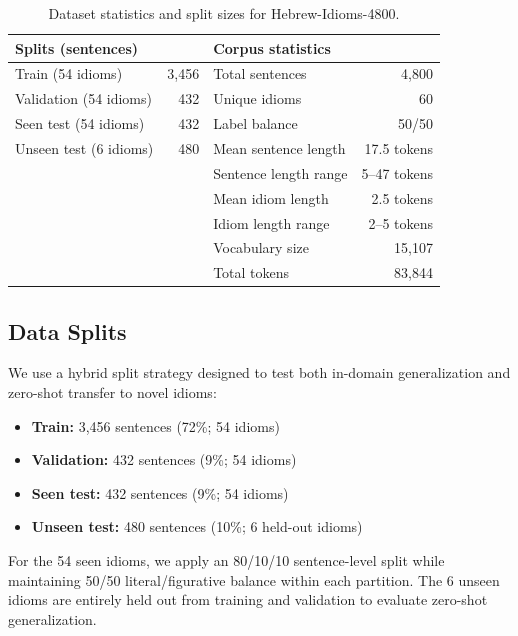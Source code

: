 \documentclass[11pt]{article}
\begin{document}
\begin{table}[t]
\centering
\small
\setlength{\tabcolsep}{3pt}
\renewcommand{\arraystretch}{0.95}
\begin{tabularx}{\linewidth}{@{}l r X r@{}}
\toprule
\multicolumn{2}{l}{\textbf{Splits (sentences)}} & \multicolumn{2}{l}{\textbf{Corpus statistics}} \\
\midrule
Train (54 idioms) & 3,456 & Total sentences & 4,800 \\
Validation (54 idioms) & 432 & Unique idioms & 60 \\
Seen test (54 idioms) & 432 & Label balance & 50/50 \\
Unseen test (6 idioms) & 480 & Mean sentence length & 17.5 tokens \\
 &  & Sentence length range & 5--47 tokens \\
 &  & Mean idiom length & 2.5 tokens \\
 &  & Idiom length range & 2--5 tokens \\
 &  & Vocabulary size & 15,107 \\
 &  & Total tokens & 83,844 \\
\bottomrule
\end{tabularx}
\caption{Dataset statistics and split sizes for Hebrew-Idioms-4800.}
\label{tab:dataset_stats}
\end{table}

\subsection{Data Splits}

We use a hybrid split strategy designed to test both in-domain generalization and zero-shot transfer to novel idioms:
\begin{itemize}
    \item \textbf{Train:} 3,456 sentences (72\%; 54 idioms)
    \item \textbf{Validation:} 432 sentences (9\%; 54 idioms)
    \item \textbf{Seen test:} 432 sentences (9\%; 54 idioms)
    \item \textbf{Unseen test:} 480 sentences (10\%; 6 held-out idioms)
\end{itemize}
For the 54 seen idioms, we apply an 80/10/10 sentence-level split while maintaining 50/50 literal/figurative balance within each partition. The 6 unseen idioms are entirely held out from training and validation to evaluate zero-shot generalization.
\end{document}
